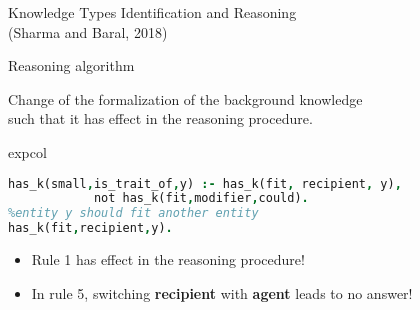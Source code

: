 \documentclass[svgnames, final, 20pt]{beamer} %
\begin{document}
\begin{frame}[fragile]
\begin{columns}[t]
\begin{block}{Knowledge Types Identification and Reasoning\\(Sharma and Baral, 2018)}

\begin{block}{Reasoning algorithm}


 Change of the formalization of the background knowledge \\such that it has effect in the reasoning procedure.
\begin{beamercolorbox}[rounded=true,sep=0.3cm]{expcol}
\begin{lstlisting}[language = Prolog, style =SC, numbers=right,
numberstyle=\tiny]
%entity y is small if we know it could not fit another entity
has_k(small,is_trait_of,y) :- has_k(fit, recipient, y), 
			not has_k(fit,modifier,could).
%entity y should fit another entity 
has_k(fit,recipient,y).
\end{lstlisting}
\end{beamercolorbox}
\begin{itemize}
	\item  Rule 1 {\color{myorange}has effect} in the reasoning procedure!
	\item In rule 5, switching \textbf{recipient} with \textbf{agent} leads to no answer!
\end{itemize}


\end{block}
\end{block}
\end{columns}
\end{frame}
\end{document}
